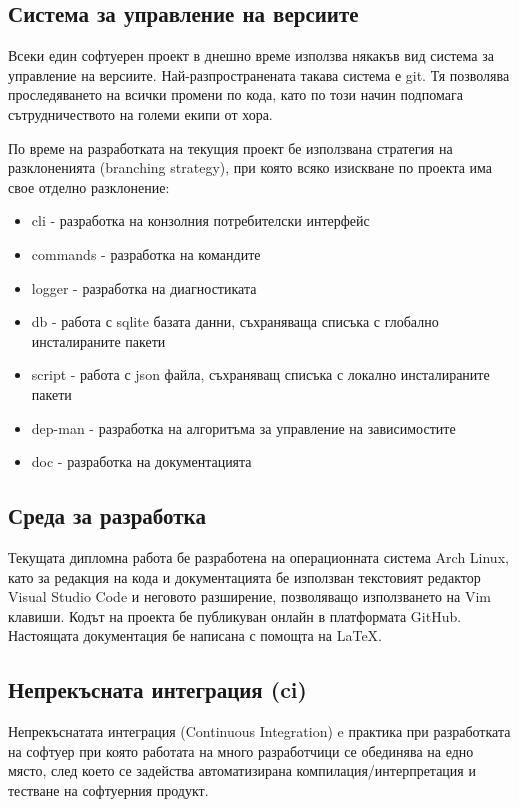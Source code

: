 \subsection{Система за управление на версиите}

Всеки един софтуерен проект в днешно време използва някакъв вид система за
управление на версиите. Най-разпространената такава система е git. Тя позволява
проследяването на всички промени по кода, като по този начин подпомага
сътрудничеството на големи екипи от хора.

По време на разработката на текущия проект бе използвана стратегия на
разклоненията (branching strategy), при която всяко изискване по проекта има
свое отделно разклонение:

\begin{itemize}
    \item cli - разработка на конзолния потребителски интерфейс
    \item commands - разработка на командите
    \item logger - разработка на диагностиката
    \item db - работа с sqlite базата данни, съхраняваща списъка с глобално
          инсталираните пакети
    \item script - работа с \acrshort{json} файла, съхраняващ списъка с локално
          инсталираните пакети
    \item dep-man - разработка на алгоритъма за управление на зависимостите
    \item doc - разработка на документацията
\end{itemize}


\subsection{Среда за разработка}

Текущата дипломна работа бе разработена на операционната система Arch Linux,
като за редакция на кода и документацията бе използван текстовият редактор
Visual Studio Code и неговото разширение, позволяващо използването на Vim
клавиши. Кодът на проекта бе публикуван онлайн в платформата GitHub. Настоящата
документация бе написана с помощта на \LaTeX.


\subsection{Непрекъсната интеграция (\acrshort{ci})}

Непрекъснатата интеграция (Continuous Integration)  e практика
при разработката на софтуер при която работата на много разработчици се
обединява на едно място, след което се задейства автоматизирана
компилация/интерпретация и тестване на софтуерния продукт.

